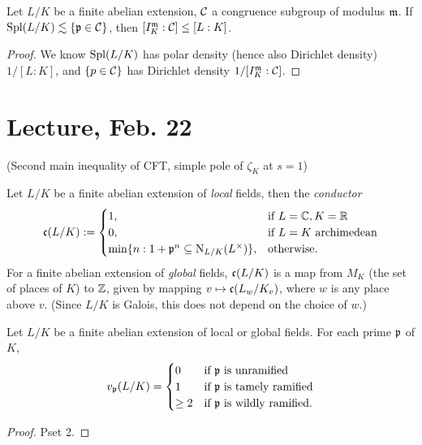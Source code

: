 \documentclass[11pt]{amsart}
\begin{document}
\begin{cor}
\label{main_ineq}
    Let $L/K$ be a finite abelian extension, $\mathcal{C}$ a congruence subgroup of modulus $\mathfrak{m}$. If $\operatorname{Spl}(L/K) \lesssim \{\mathfrak{p}\in \mathcal{C}\}$, then $[I_K^{\mathfrak{m}} : \mathcal{C}] \le [L:K]$.
\end{cor}

\begin{proof}
    We know $\operatorname{Spl}(L/K)$ has polar density (hence also Dirichlet density) $1/[L:K]$, and $\{p\in \mathcal{C}\}$ has Dirichlet density $1/[I_K^{\mathfrak{m}}: \mathcal{C}]$.
\end{proof}


\section{Lecture, Feb. 22}

(Second main inequality of CFT, simple pole of $\zeta_K$ at $s=1$)

\begin{defn}
    Let $L/K$ be a finite abelian extension of \emph{local} fields, then the \emph{conductor} 
    \[
    \mathfrak{c}(L/K) := \begin{cases}
        1, & \text{if } L=\mathbb{C}, K = \mathbb{R} \\
        0, & \text{if } L = K \text{ archimedean} \\
        \min\{n: 1 + \mathfrak{p}^n \subseteq \operatorname{N}_{L/K}(L^\times)\}, & \text{otherwise.}
    \end{cases}
    \]
    For a finite abelian extension of \emph{global} fields, $\mathfrak{c}(L/K)$ is a map from $M_K$ (the set of places of $K$) to $\mathbb{Z}$, given by mapping $v \mapsto \mathfrak{c}(L_w/K_v)$, where $w$ is any place above $v$. (Since $L/K$ is Galois, this does not depend on the choice of $w$.) 
\end{defn}

\begin{prop}
    Let $L/K$ be a finite abelian extension of local or global fields. For each prime $\mathfrak{p}$ of $K$, 
    \[v_{\mathfrak{p}}(L/K) = \begin{cases}
    0 & \text{if } \mathfrak{p} \text{ is unramified} \\
    1 & \text{if } \mathfrak{p} \text{ is tamely ramified} \\
    \ge 2 & \text{if } \mathfrak{p} \text{ is wildly ramified.}
    \end{cases}\]
\end{prop}

\begin{proof}
    Pset 2.
\end{proof}
\end{document}
